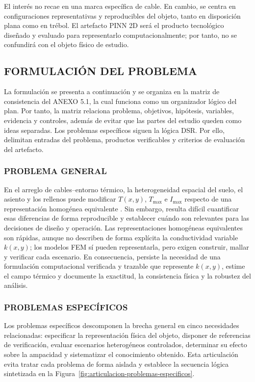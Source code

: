 \documentclass[11pt,a4paper,oneside]{report}
\newcommand{\Tmax}{T_{\max}}
\newcommand{\Imax}{I_{\max}}
\newcommand{\kx}{k(x,y)}
\begin{document}
El interés no recae en una marca específica de cable. En cambio, se centra en configuraciones representativas y reproducibles del objeto, tanto en disposición plana como en trébol. El artefacto PINN 2D será el producto tecnológico diseñado y evaluado para representarlo computacionalmente; por tanto, no se confundirá con el objeto físico de estudio.

\subsection{FORMULACIÓN DEL PROBLEMA}

La formulación se presenta a continuación y se organiza en la matriz de consistencia del ANEXO 5.1, la cual funciona como un organizador lógico del plan. Por tanto, la matriz relaciona problema, objetivos, hipótesis, variables, evidencia y controles, además de evitar que las partes del estudio queden como ideas separadas. Los problemas específicos siguen la lógica DSR. Por ello, delimitan entradas del problema, productos verificables y criterios de evaluación del artefacto.

\subsubsection{PROBLEMA GENERAL}

En el arreglo de cables--entorno térmico, la heterogeneidad espacial del suelo, el asiento y los rellenos puede modificar $T(x,y)$, $\Tmax$ e $\Imax$ respecto de una representación homogénea equivalente \parencites[4--6]{enescu2021}[3--4,93--99]{cigre2025}. Sin embargo, resulta difícil cuantificar esas diferencias de forma reproducible y establecer cuándo son relevantes para las decisiones de diseño y operación. Las representaciones homogéneas equivalentes son rápidas, aunque no describen de forma explícita la conductividad variable $\kx$; los modelos FEM sí pueden representarla, pero exigen construir, mallar y verificar cada escenario. En consecuencia, persiste la necesidad de una formulación computacional verificada y trazable que represente $\kx$, estime el campo térmico y documente la exactitud, la consistencia física y la robustez del análisis.

\subsubsection{PROBLEMAS ESPECÍFICOS}

Los problemas específicos descomponen la brecha general en cinco necesidades relacionadas: especificar la representación física del objeto, disponer de referencias de verificación, evaluar escenarios heterogéneos controlados, determinar su efecto sobre la ampacidad y sistematizar el conocimiento obtenido. Esta articulación evita tratar cada problema de forma aislada y establece la secuencia lógica sintetizada en la Figura~\ref{fig:articulacion-problemas-especificos}.
\end{document}
